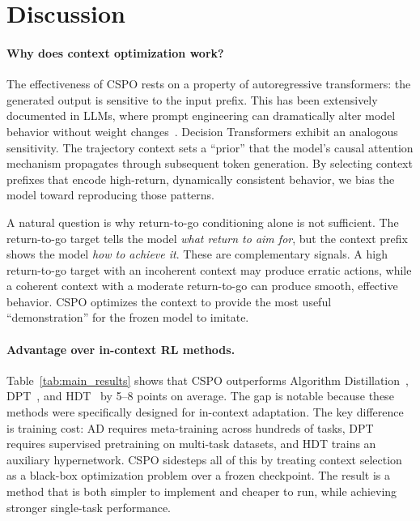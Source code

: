 \documentclass{article}
\newcommand{\cspo}{\textsc{CSPO}}
\begin{document}
\section{Discussion}
\label{sec:discussion}

\paragraph{Why does context optimization work?}
The effectiveness of \cspo{} rests on a property of autoregressive transformers: the generated output is sensitive to the input prefix. This has been extensively documented in LLMs, where prompt engineering can dramatically alter model behavior without weight changes~\citep{brown2020language}. Decision Transformers exhibit an analogous sensitivity. The trajectory context sets a ``prior'' that the model's causal attention mechanism propagates through subsequent token generation. By selecting context prefixes that encode high-return, dynamically consistent behavior, we bias the model toward reproducing those patterns.

A natural question is why return-to-go conditioning alone is not sufficient. The return-to-go target tells the model \emph{what return to aim for}, but the context prefix shows the model \emph{how to achieve it}. These are complementary signals. A high return-to-go target with an incoherent context may produce erratic actions, while a coherent context with a moderate return-to-go can produce smooth, effective behavior. \cspo{} optimizes the context to provide the most useful ``demonstration'' for the frozen model to imitate.

\paragraph{Advantage over in-context RL methods.}
Table~\ref{tab:main_results} shows that \cspo{} outperforms Algorithm Distillation~\citep{laskin2022incontext}, DPT~\citep{lee2024supervised}, and HDT~\citep{xu2023hdt} by 5--8 points on average. The gap is notable because these methods were specifically designed for in-context adaptation. The key difference is training cost: AD requires meta-training across hundreds of tasks, DPT requires supervised pretraining on multi-task datasets, and HDT trains an auxiliary hypernetwork. \cspo{} sidesteps all of this by treating context selection as a black-box optimization problem over a frozen checkpoint. The result is a method that is both simpler to implement and cheaper to run, while achieving stronger single-task performance.
\end{document}
